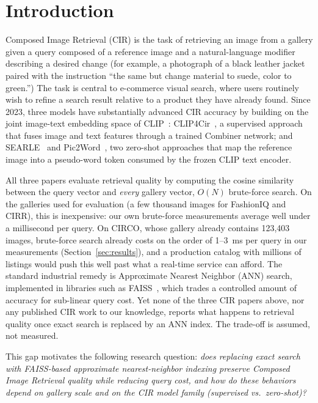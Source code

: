 \documentclass[conference]{IEEEtran}
\begin{document}
\section{Introduction}
\label{sec:introduction}

Composed Image Retrieval (CIR) is the task of retrieving an image from a gallery given a query composed of a reference image and a natural-language modifier describing a desired change (for example, a photograph of a black leather jacket paired with the instruction ``the same but change material to suede, color to green.'') The task is central to e-commerce visual search, where users routinely wish to refine a search result relative to a product they have already found. Since 2023, three models have substantially advanced CIR accuracy by building on the joint image-text embedding space of CLIP~\cite{radford2021clip}: CLIP4Cir~\cite{baldrati2023composed}, a supervised approach that fuses image and text features through a trained Combiner network; and SEARLE~\cite{baldrati2023zero} and Pic2Word~\cite{saito2023pic2word}, two zero-shot approaches that map the reference image into a pseudo-word token consumed by the frozen CLIP text encoder.

All three papers evaluate retrieval quality by computing the cosine similarity between the query vector and \emph{every} gallery vector, $O(N)$ brute-force search. On the galleries used for evaluation (a few thousand images for FashionIQ and CIRR), this is inexpensive: our own brute-force measurements average well under a millisecond per query. On CIRCO, whose gallery already contains 123,403 images, brute-force search already costs on the order of 1--3~ms per query in our measurements (Section~\ref{sec:results}), and a production catalog with millions of listings would push this well past what a real-time service can afford. The standard industrial remedy is Approximate Nearest Neighbor (ANN) search, implemented in libraries such as FAISS~\cite{johnson2019faiss}, which trades a controlled amount of accuracy for sub-linear query cost. Yet none of the three CIR papers above, nor any published CIR work to our knowledge, reports what happens to retrieval quality once exact search is replaced by an ANN index. The trade-off is assumed, not measured.

This gap motivates the following research question: \emph{does replacing exact search with FAISS-based approximate nearest-neighbor indexing preserve Composed Image Retrieval quality while reducing query cost, and how do these behaviors depend on gallery scale and on the CIR model family (supervised vs.\ zero-shot)?}
\end{document}
